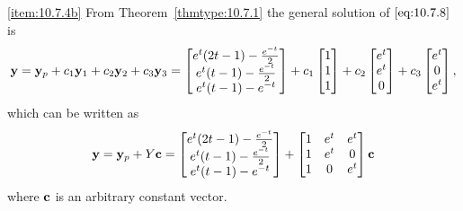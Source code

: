 \documentclass{ximera}
\begin{document}
\begin{example}
\begin{explanation}
\ref{item:10.7.4b}
From Theorem~\ref{thmtype:10.7.1} the general solution of
$\eqref{eq:10.7.8}$ is
$$
{\bf y}={\bf y}_p+c_1{\bf y}_1+c_2{\bf y}_2+c_3{\bf y}_3=
\begin{bmatrix}e^t(2t-1)-\frac{e^{-t}}{2}\\
e^t(t-1)-\frac{e^{-t}}{2}\\
e^t(t-1)-e^{-t}\end{bmatrix}+
c_1\begin{bmatrix}1\\1\\1\end{bmatrix}+
c_2\begin{bmatrix}e^t\\e^t\\0\end{bmatrix}
+c_3\begin{bmatrix}e^t\\0\\e^t\end{bmatrix},
$$
which can  be written as
$$
{\bf y}={\bf y}_p+Y{\bf c}=
\begin{bmatrix}e^t(2t-1)-\frac{e^{-t}}{2}\\
e^t(t-1)-\frac{e^{-t}}{2}\\
e^t(t-1)-e^{-t} \end{bmatrix}+
\begin{bmatrix}1&e^t&e^t\\1&e^t&0\\1&0&e^t\end{bmatrix}{\bf c}
$$
where ${\bf c}$ is an arbitrary constant vector.
\end{explanation}
\end{example}
\end{document}
